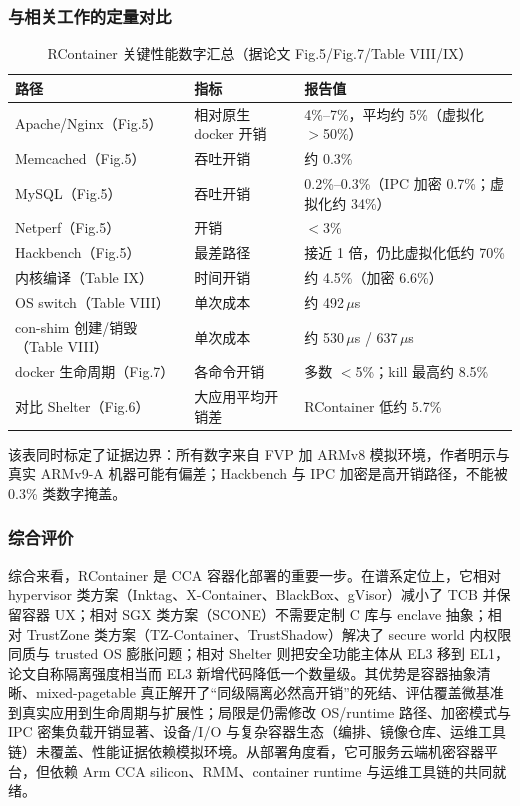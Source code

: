 \documentclass[11pt]{ctexart}
\begin{document}
\subsubsection{与相关工作的定量对比}
\begin{table}[htbp]
\centering\small
\caption{RContainer 关键性能数字汇总（据论文 Fig.5/Fig.7/Table VIII/IX）}
\begin{tabular}{lll}
\toprule
路径 & 指标 & 报告值 \\
\midrule
Apache/Nginx（Fig.5） & 相对原生 docker 开销 & 4\%--7\%，平均约 5\%（虚拟化 $>$50\%） \\
Memcached（Fig.5） & 吞吐开销 & 约 0.3\% \\
MySQL（Fig.5） & 吞吐开销 & 0.2\%--0.3\%（IPC 加密 0.7\%；虚拟化约 34\%） \\
Netperf（Fig.5） & 开销 & $<$3\% \\
Hackbench（Fig.5） & 最差路径 & 接近 1 倍，仍比虚拟化低约 70\% \\
内核编译（Table IX） & 时间开销 & 约 4.5\%（加密 6.6\%） \\
OS switch（Table VIII） & 单次成本 & 约 492$\,\mu$s \\
con-shim 创建/销毁（Table VIII） & 单次成本 & 约 530$\,\mu$s / 637$\,\mu$s \\
docker 生命周期（Fig.7） & 各命令开销 & 多数 $<$5\%；kill 最高约 8.5\% \\
对比 Shelter（Fig.6） & 大应用平均开销差 & RContainer 低约 5.7\% \\
\bottomrule
\end{tabular}
\end{table}
该表同时标定了证据边界：所有数字来自 FVP 加 ARMv8 模拟环境，作者明示与真实 ARMv9-A 机器可能有偏差；Hackbench 与 IPC 加密是高开销路径，不能被 0.3\% 类数字掩盖。\par
\subsubsection{综合评价}
综合来看，RContainer 是 CCA 容器化部署的重要一步。在谱系定位上，它相对 hypervisor 类方案（Inktag、X-Container、BlackBox、gVisor）减小了 TCB 并保留容器 UX；相对 SGX 类方案（SCONE）不需要定制 C 库与 enclave 抽象；相对 TrustZone 类方案（TZ-Container、TrustShadow）解决了 secure world 内权限同质与 trusted OS 膨胀问题；相对 Shelter 则把安全功能主体从 EL3 移到 EL1，论文自称隔离强度相当而 EL3 新增代码降低一个数量级。其优势是容器抽象清晰、mixed-pagetable 真正解开了“同级隔离必然高开销”的死结、评估覆盖微基准到真实应用到生命周期与扩展性；局限是仍需修改 OS/runtime 路径、加密模式与 IPC 密集负载开销显著、设备/I/O 与复杂容器生态（编排、镜像仓库、运维工具链）未覆盖、性能证据依赖模拟环境。从部署角度看，它可服务云端机密容器平台，但依赖 Arm CCA silicon、RMM、container runtime 与运维工具链的共同就绪。\par
\end{document}
